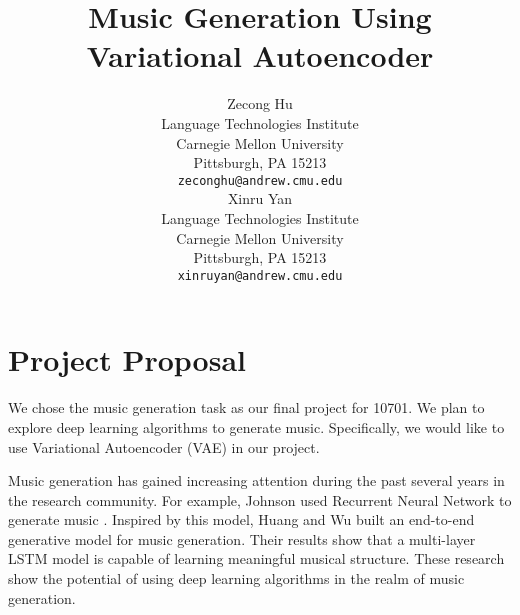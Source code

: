 \documentclass{article}
\title{Music Generation Using Variational Autoencoder}
\author{
  Zecong Hu\\
  Language Technologies Institute\\
  Carnegie Mellon University\\
  Pittsburgh, PA 15213 \\
  \texttt{zeconghu@andrew.cmu.edu} \\
  \And
  Xinru Yan \\
  Language Technologies Institute\\
  Carnegie Mellon University\\
  Pittsburgh, PA 15213 \\
  \texttt{xinruyan@andrew.cmu.edu} \\
}
\begin{document}

\maketitle


\section{Project Proposal}

We chose the music generation task as our final project for 10701. We plan to explore deep learning algorithms to generate music. Specifically, we would like to use Variational Autoencoder (VAE) in our project. 

Music generation has gained increasing attention during the past several years in the research community. For example, Johnson used Recurrent Neural Network to generate music \cite{johnson}. Inspired by this model, Huang and Wu built an end-to-end generative model for music generation\cite{huang}. Their results show that a multi-layer LSTM model is capable of learning meaningful musical structure. These research show the potential of using deep learning algorithms in the realm of music generation.
\end{document}
